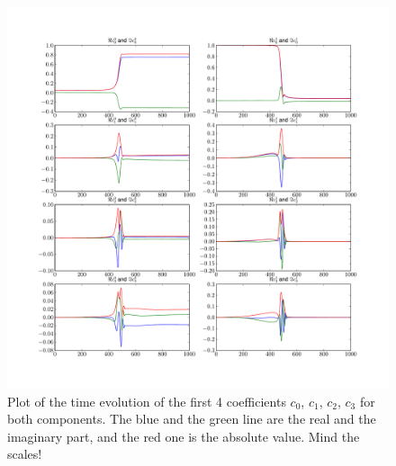 \begin{figure}
  \centering
  \includegraphics[width=\linewidth]{./plot/delta_gap/Parameters_h_dt0.01_eps0.1_d1.0e_p1/hagedorn_coefficients_first.pdf}
  \caption{Plot of the time evolution of the first 4 coefficients $c_0$, $c_1$, $c_2$, $c_3$ for both components. The blue and the green line are the
  real and the imaginary part, and the red one is the absolute value. Mind the scales!}
  \label{fig:delta_gap_coefficients_first}
\end{figure}

